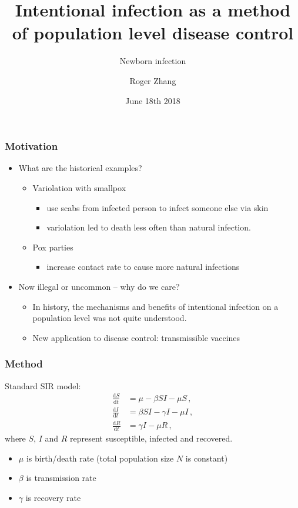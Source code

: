 \documentclass[12pt]{beamer}
\title{Intentional infection as a method of population level disease control}
\subtitle{Newborn infection}
\author{Roger Zhang}
\date{June 18th 2018}
\institute{McMaster University Department of Mathematics and Statistics}
\newcommand\dbyd[2]{\frac{\mathrm d{#1}}{\mathrm d{#2}}}
\begin{document}
\begin{frame}
\titlepage
\end{frame}
\begin{frame}
\frametitle{Motivation}
\begin{itemize}
\setlength\itemsep{10pt}
\item What are the historical examples?
\pause
\begin{itemize}
\setlength\itemsep{10pt}
\item Variolation with smallpox
\begin{itemize}
\pause\item use scabs from infected person to infect someone else via skin
\pause\item variolation led to death less often than natural infection.
\end{itemize}
\pause\item Pox parties
\begin{itemize}
\pause\item increase contact rate to cause more natural infections
\end{itemize}
\end{itemize}
\pause
\item Now illegal or uncommon -- why do we care?
\begin{itemize}
\setlength\itemsep{10pt}
\pause\item In history, the mechanisms and benefits of intentional infection  on a population level was not quite understood.
\pause\item New application to disease control: transmissible vaccines
\end{itemize}
\end{itemize}
\end{frame}
\begin{frame}
\frametitle{Method}
Standard SIR model:
\pause
\begin{equation}\label{1}
\begin{split}
\dbyd{S}{t}&=\mu- \beta SI-\mu S \,,\\
\dbyd{I}{t}&=\beta SI-\gamma I -\mu I\,,\\
\dbyd{R}{t}&=\gamma I-\mu R\,,
\end{split}
\end{equation}
where $S$, $I$ and $R$ represent susceptible, infected and recovered.
\begin{itemize}
\setlength\itemsep{10pt}
\item $\mu$ is birth/death rate  \qquad(total population size $N$ is constant)
\item $\beta$ is transmission rate
\item $\gamma$ is recovery rate
\end{itemize}
\end{frame}
\end{document}
